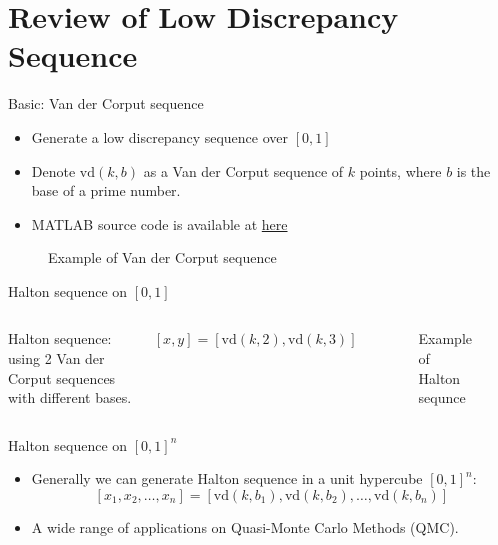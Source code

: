 \documentclass[10pt,ignorenonframetext,serif,onlymath]{beamer}
\begin{document}
\hypertarget{review-of-low-discrepancy-sequence}{%
\section{Review of Low Discrepancy
Sequence}\label{review-of-low-discrepancy-sequence}}

\begin{frame}{Basic: Van der Corput sequence}
\protect\hypertarget{basic-van-der-corput-sequence}{}

\begin{itemize}
\item
  Generate a low discrepancy sequence over \([0,1]\)
\item
  Denote \(\mathrm{vd}(k,b)\) as a Van der Corput sequence of \(k\)
  points, where \(b\) is the base of a prime number.
\item
  MATLAB source code is available at
  \href{http://www.mathworks.com/matlabcentral/fileexchange/15354-generate-a-van-der-corput-sequence}{here}
\end{itemize}

\begin{figure}[hp]
\centering

\caption{Example of Van der Corput sequence}%
\label{fig:vdc}
\end{figure}

\end{frame}

\begin{frame}{Halton sequence on \([0,1]\)}
\protect\hypertarget{halton-sequence-on-01}{}

\begin{columns}


Halton sequence: using 2 Van der Corput sequences with different bases.

\([x,y] = [\mathrm{vd}(k,2), \mathrm{vd}(k,3)]\)


\begin{figure}[hp]
\centering

\caption{Example of Halton sequnce}%
\label{fig:halton}
\end{figure}

\end{columns}

\end{frame}

\begin{frame}{Halton sequence on \([0,1]^n\)}
\protect\hypertarget{halton-sequence-on-01n}{}

\begin{itemize}
\item
  Generally we can generate Halton sequence in a unit hypercube
  \([0,1]^n\):
  \[[x_1, x_2, \ldots, x_n] = [\mathrm{vd}(k,b_1), \mathrm{vd}(k,b_2), \ldots, \mathrm{vd}(k,b_n)]\]
\item
  A wide range of applications on Quasi-Monte Carlo Methods (QMC).
\end{itemize}

\end{frame}
\end{document}
